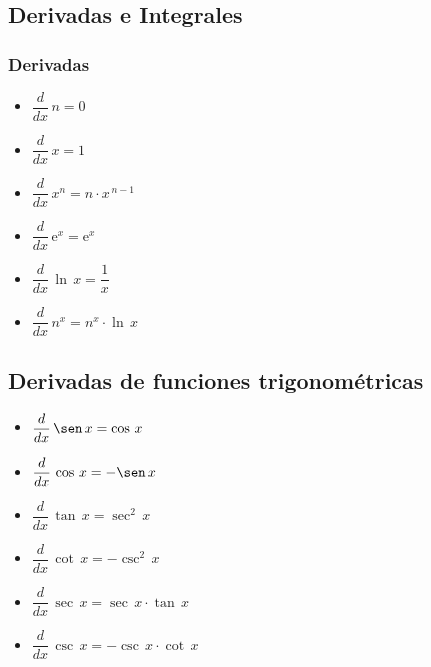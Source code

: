 \documentclass[11pt, twocolumn, landscape, a4paper]{article}
\begin{document}
\subsection*{Derivadas e Integrales} %
\subsubsection*{Derivadas}
\begin{itemize}
\item $\dfrac{d}{dx}\,n = 0$
\item $\dfrac{d}{dx}\,x = 1$ 
\item $\dfrac{d}{dx}\,x^n = n \cdot x^{\,n - 1}$ 
\item $\dfrac{d}{dx}\,\mathrm{e}^x = \mathrm{e}^x$ 
\item $\dfrac{d}{dx}\,\ln\,x = \dfrac1{x}$ 
\item $\dfrac{d}{dx}\,n^{x} = n^{x}\cdot\ln\,x$ 
\end{itemize}
\subsection*{Derivadas de funciones trigonométricas} 
\begin{itemize}
\item $\dfrac{d}{dx}\,\sen\,{x} = \cos\,x$
\item $\dfrac{d}{dx}\,\cos\,{x} = -\sen\,x$

\item $\dfrac{d}{dx}\,\tan\,{x} = \sec^{2}\,x$
\item $\dfrac{d}{dx}\,\cot\,{x} = -\csc^{2}\,x$

\item $\dfrac{d}{dx}\,\sec\,{x} = \sec\,x\cdot\tan\,x$
\item $\dfrac{d}{dx}\,\csc\,{x} = -\csc\,x\cdot\cot\,x$
\end{itemize}
\end{document}
